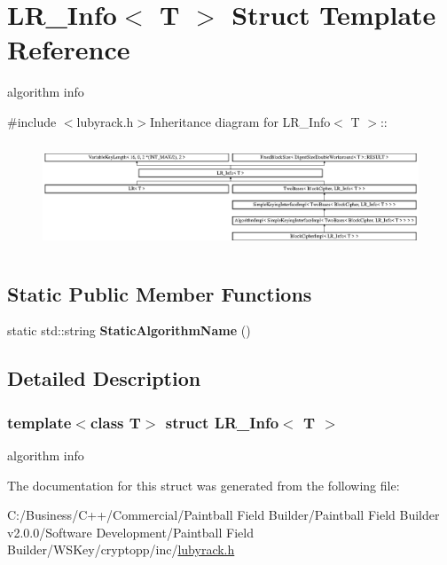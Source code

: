 \hypertarget{struct_l_r___info}{
\section{LR\_\-Info$<$ T $>$ Struct Template Reference}
\label{struct_l_r___info}
}


algorithm info  


{\ttfamily \#include $<$lubyrack.h$>$}Inheritance diagram for LR\_\-Info$<$ T $>$::\begin{figure}[H]
\begin{center}
\leavevmode
\includegraphics[height=3.20611cm]{struct_l_r___info}
\end{center}
\end{figure}
\subsection*{Static Public Member Functions}
\begin{DoxyCompactItemize}
\item 
\hypertarget{struct_l_r___info_a62a21cb8057cc805c7dc493bd007423a}{
static std::string {\bfseries StaticAlgorithmName} ()}
\label{struct_l_r___info_a62a21cb8057cc805c7dc493bd007423a}

\end{DoxyCompactItemize}


\subsection{Detailed Description}
\subsubsection*{template$<$class T$>$ struct LR\_\-Info$<$ T $>$}

algorithm info 

The documentation for this struct was generated from the following file:\begin{DoxyCompactItemize}
\item 
C:/Business/C++/Commercial/Paintball Field Builder/Paintball Field Builder v2.0.0/Software Development/Paintball Field Builder/WSKey/cryptopp/inc/\hyperlink{lubyrack_8h}{lubyrack.h}\end{DoxyCompactItemize}

